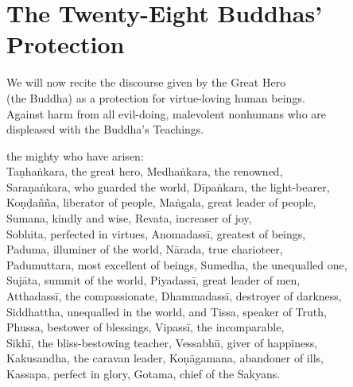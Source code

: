 \cleartoverso

\chapter{The Twenty-Eight Buddhas' Protection}%

\vspace*{5pt}

{\setlength{\parskip}{0pt}%

\begin{soloonechants}
We will now recite the discourse given by the Great Hero\\
(the Buddha) as a protection for virtue-loving human beings.\\
Against harm from all evil-doing, malevolent nonhumans who are\\
displeased with the Buddha's Teachings.\\
\end{soloonechants}%
}

\vspace*{-2pt}

\englishText

\begin{onechants}
 the mighty who have arisen:\\
Taṇhaṅkara, the great hero, Medhaṅkara, the renowned,\\
Saraṇaṅkara, who guarded the world, Dīpaṅkara, the light-bearer,\\
Koṇḍañña, liberator of people, Maṅgala, great leader of people,\\
Sumana, kindly and wise, Revata, increaser of joy,\\
Sobhita, perfected in virtues, Anomadassī, greatest of beings,\\
Paduma, illuminer of the world, Nārada, true charioteer,\\
Padumuttara, most excellent of beings, Sumedha, the unequalled one,\\
Sujāta, summit of the world,  Piyadassī, great leader of men,\\
Atthadassī, the compassionate, Dhammadassī, destroyer of darkness,\\
Siddhattha, unequalled in the world,  and Tissa, speaker of Truth,\\
Phussa, bestower of blessings, Vipassī, the incomparable,\\
Sikhī, the bliss-bestowing teacher, Vessabhū, giver of happiness,\\
Kakusandha, the caravan leader, Koṇāgamana, abandoner of ills,\\
Kassapa, perfect in glory, Gotama, chief of the Sakyans.\\
\end{onechants}

